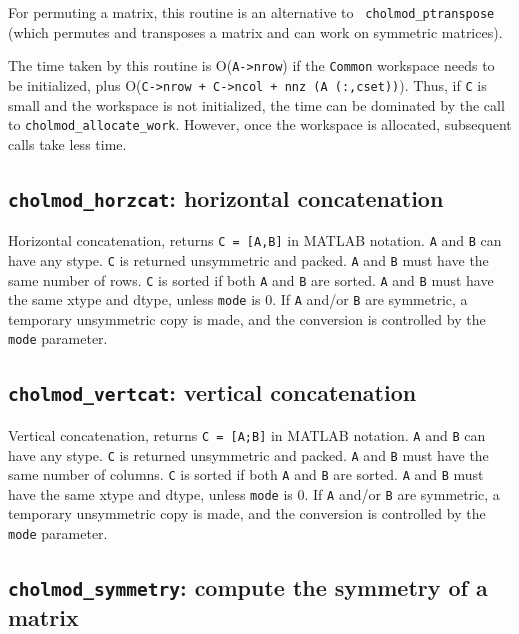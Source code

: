 \documentclass[11pt]{article}
\begin{document}
For permuting a matrix, this routine is an alternative to {\tt
cholmod\_ptranspose} (which permutes and transposes a matrix and can work on
symmetric matrices).

The time taken by this routine is O({\tt A->nrow}) if the {\tt Common}
workspace needs to be initialized, plus O({\tt C->nrow + C->ncol + nnz (A
(:,cset))}).  Thus, if {\tt C} is small and the workspace is not initialized,
the time can be dominated by the call to {\tt cholmod\_allocate\_work}.
However, once the workspace is allocated, subsequent calls take less time.

\subsection{{\tt cholmod\_horzcat}: horizontal concatenation}


Horizontal concatenation, returns {\tt C = [A,B]} in MATLAB notation.  {\tt A}
and {\tt B} can have any stype.  {\tt C} is returned unsymmetric and packed.
{\tt A} and {\tt B} must have the same number of rows.  {\tt C} is sorted if
both {\tt A} and {\tt B} are sorted.  {\tt A} and {\tt B} must have the same
xtype and dtype, unless {\tt mode} is 0.
%
If \verb'A' and/or \verb'B' are symmetric, a temporary unsymmetric copy is
made, and the conversion is controlled by the \verb'mode' parameter.

\subsection{{\tt cholmod\_vertcat}: vertical concatenation}


Vertical concatenation, returns {\tt C = [A;B]} in MATLAB notation.  {\tt A}
and {\tt B} can have any stype.  {\tt C} is returned unsymmetric and packed.
{\tt A} and {\tt B} must have the same number of columns.  {\tt C} is sorted if
both {\tt A} and {\tt B} are sorted.  {\tt A} and {\tt B} must have the same
xtype and dtype, unless {\tt mode} is 0.
%
If \verb'A' and/or \verb'B' are symmetric, a temporary unsymmetric copy is
made, and the conversion is controlled by the \verb'mode' parameter.

\subsection{{\tt cholmod\_symmetry}: compute the symmetry of a matrix}
\end{document}
